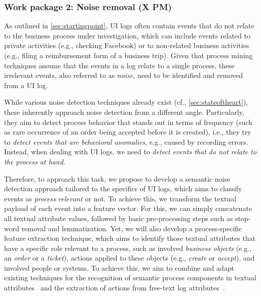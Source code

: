 
\subsubsection{Work package 2:  Noise removal (X PM)}
\label{sec:wp2}

As outlined in \autoref{sec:startingpoint}, UI logs often contain events that do not relate to the business process under investigation, which can include events related to private activities (e.g., checking Facebook) or to non-related business activities (e.g., filing a reimbursement form of a business trip).
Given that process mining techniques assume that the events in a log relate to a single process, these irrelevant events, also referred to as \emph{noise}, need to be identified and removed from a UI log.

While various noise detection techniques already exist (cf., \autoref{sec:stateoftheart}), these  inherently approach noise detection from a different angle. Particularly, they aim to detect process behavior that stands out in terms of frequency (such as rare occurrence of an order being accepted before it is created), i.e., they try to \emph{detect events that are behavioral anomalies}, e.g., caused by recording errors.
Instead, when dealing with UI logs, we need to \emph{detect events that do not relate to the process at hand}. 

Therefore, to approach this task, we propose to develop a semantic noise detection approach tailored to the specifics of UI logs, which aims to classify events as \emph{process relevant} or not. 
To achieve this, we transform the textual payload of each event into a feature vector.
For this, we can simply concatenate all textual attribute values, followed by basic pre-processing steps such as stop-word removal and lemmatization. Yet, we will also develop a process-specific feature extraction technique, which aims to identify those textual attributes that have a specific role relevant to a process, such as involved \emph{business objects} (e.g., an \emph{order} or a \emph{ticket}), actions applied to these objects (e.g., \emph{create} or \emph{accept}), and involved people or systems. To achieve this, we aim to combine and adapt existing techniques for the recognition of semantic process components in textual attributes~\cite{rebmann2021extracting} and the extraction of actions from free-text log attributes~\cite{gupta2020analyzing}.

